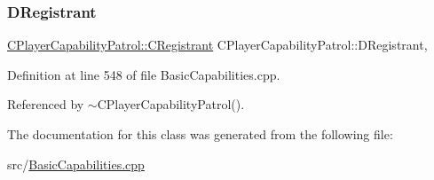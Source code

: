 \subsubsection{\texorpdfstring{D\+Registrant}{DRegistrant}}
{\footnotesize\ttfamily \hyperlink{classCPlayerCapabilityPatrol_1_1CRegistrant}{C\+Player\+Capability\+Patrol\+::\+C\+Registrant} C\+Player\+Capability\+Patrol\+::\+D\+Registrant\hspace{0.3cm}{\ttfamily [static]}, {\ttfamily [protected]}}



Definition at line 548 of file Basic\+Capabilities.\+cpp.



Referenced by $\sim$\+C\+Player\+Capability\+Patrol().



The documentation for this class was generated from the following file\+:\begin{DoxyCompactItemize}
\item 
src/\hyperlink{BasicCapabilities_8cpp}{Basic\+Capabilities.\+cpp}\end{DoxyCompactItemize}
